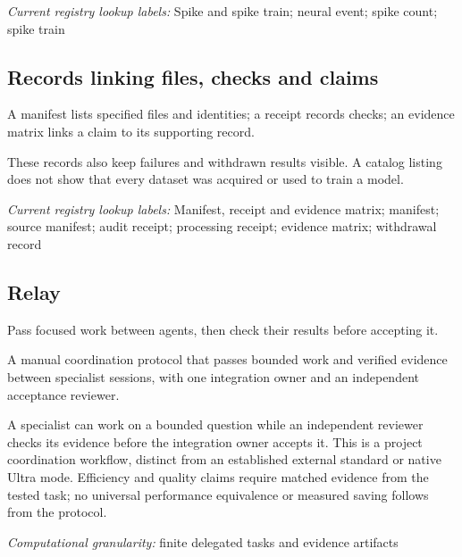 \noindent\textit{Current registry lookup labels:} Spike and spike train; neural event; spike count; spike train\par

\begin{samepage}
\subsection*{Records linking files, checks and claims}
\noindent A manifest lists specified files and identities; a receipt records checks; an evidence matrix links a claim to its supporting record.\par
\end{samepage}
\begin{samepage}
\noindent These records also keep failures and withdrawn results visible. A catalog listing does not show that every dataset was acquired or used to train a model.\par\nopagebreak[4]

\end{samepage}


\noindent\textit{Current registry lookup labels:} Manifest, receipt and evidence matrix; manifest; source manifest; audit receipt; processing receipt; evidence matrix; withdrawal record\par

\begin{samepage}
\subsection*{Relay}
\noindent Pass focused work between agents, then check their results before accepting it.\par
\end{samepage}
\noindent A manual coordination protocol that passes bounded work and verified evidence between specialist sessions, with one integration owner and an independent acceptance reviewer.\par
\noindent A specialist can work on a bounded question while an independent reviewer checks its evidence before the integration owner accepts it. This is a project coordination workflow, distinct from an established external standard or native Ultra mode. Efficiency and quality claims require matched evidence from the tested task; no universal performance equivalence or measured saving follows from the protocol.\par
\begin{samepage}
\noindent\textit{Computational granularity:} finite delegated tasks and evidence artifacts\par\nopagebreak[4]

\end{samepage}


